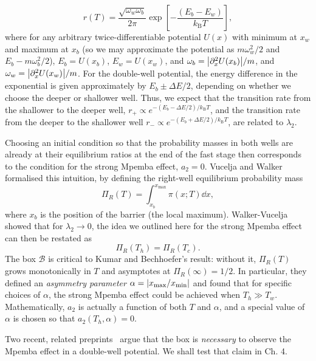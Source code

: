 \documentclass[hyperref={colorlinks=true, urlcolor=blue, citecolor=blue, final, bound}]{sfuthesis}
\newcommand{\kB}{k_{\mathrm{B}}}
\begin{document}
\begin{equation}
    r(T) = \frac{\sqrt{\omega_w\omega_b}}{2\pi} \exp[-\frac{(E_b-E_w)}{\kB T}],
\end{equation}
where for any arbitrary twice-differentiable potential $U(x)$ with minimum at $x_w$ and maximum at $x_b$ (so we may approximate the potential as $m\omega_w^2/2$ and $E_b-m\omega_b^2/2$), $E_b = U(x_b)$, $E_w=U(x_w)$, and $\omega_b = \abs{\partial_x^2 U(x_b)}/m$, and $\omega_w = \abs{\partial_x^2U(x_w)}/m$. For the double-well potential, the energy difference in the exponential is given approximately by $E_b\pm\Delta E/2$, depending on whether we choose the deeper or shallower well. Thus, we expect that the transition rate from the shallower to the deeper well, $r_+ \propto e^{-(E_b-\Delta E/2)/\kB T}$, and the transition rate from the deeper to the shallower well $r_- \propto e^{-(E_b+\Delta E/2)/\kB T}$, are related to $\lambda_2$.
 
Choosing an initial condition so that the probability masses in both wells are already at their equilibrium ratios at the end of the fast stage then corresponds to the condition for the strong Mpemba effect, $a_2=0$. Vucelja and Walker formalised this intuition, by defining the right-well equilibrium probability mass~\cite{Walker2022}
\begin{equation}
    \Pi_R(T) = \int_{x_b}^{x_{\max}} \pi(x;T)\dd{x},
\end{equation}
where $x_b$ is the position of the barrier (the local maximum). Walker-Vucelja showed that for $\lambda_2 \rightarrow 0$, the idea we outlined here for the strong Mpemba effect can then be restated as
\begin{equation}
    \Pi_R(T_h) = \Pi_R(T_c).\label{eq:VuceljaMpemba}
\end{equation}
The box $\mathcal B$ is critical to Kumar and Bechhoefer's result: without it, $\Pi_R(T)$ grows monotonically in $T$ and asymptotes at $\Pi_R(\infty)=1/2$. In particular, they defined an \textit{asymmetry parameter} $\alpha = \abs{x_{\max}/x_{\min}}$ and found that for specific choices of $\alpha$, the strong Mpemba effect could be achieved when $T_h \gg T_w$. Mathematically, $a_2$ is actually a function of both $T$ and $\alpha$, and a special value of $\alpha$ is chosen so that $a_2(T_h,\alpha)=0$. 

Two recent, related preprints~\cite{Liu2026,Liu2026a} argue that the box is \textit{necessary} to observe the Mpemba effect in a double-well potential. We shall test that claim in Ch. 4.
\end{document}
